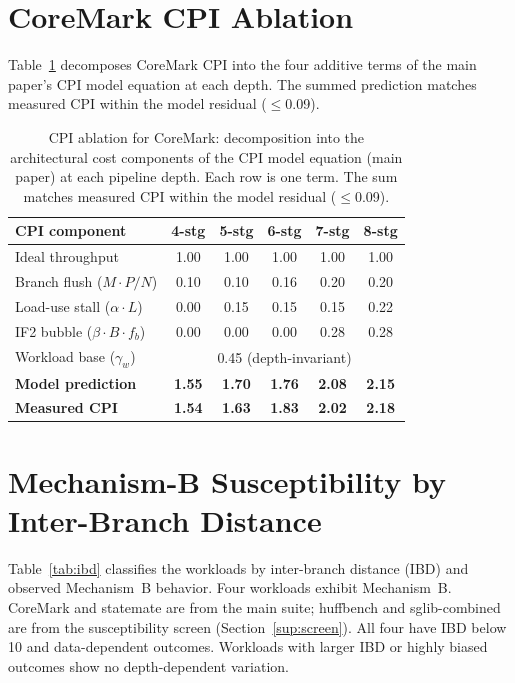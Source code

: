 \documentclass[acmsmall,nonacm,screen]{acmart}
\begin{document}
\section{CoreMark CPI Ablation}
\label{sup:ablation}
Table~\ref{tab:ablation} decomposes CoreMark CPI into the four additive terms of the
main paper's CPI model equation at each depth. The summed prediction matches measured
CPI within the model residual ($\leq$0.09).

\begin{table}[h]
\centering
\caption{CPI ablation for CoreMark: decomposition into the architectural cost components of the CPI model equation (main paper) at each pipeline depth. Each row is one term. The sum matches measured CPI within the model residual ($\leq$0.09).}
\label{tab:ablation}
\small
\begin{tabular}{@{}lccccc@{}}
\toprule
\textbf{CPI component} & \textbf{4-stg} & \textbf{5-stg} & \textbf{6-stg} & \textbf{7-stg} & \textbf{8-stg} \\
\midrule
Ideal throughput                       & 1.00 & 1.00 & 1.00 & 1.00 & 1.00 \\
Branch flush ($M \cdot P / N$)         & 0.10 & 0.10 & 0.16 & 0.20 & 0.20 \\
Load-use stall ($\alpha \cdot L$)      & 0.00 & 0.15 & 0.15 & 0.15 & 0.22 \\
IF2 bubble ($\beta \cdot B \cdot f_b$) & 0.00 & 0.00 & 0.00 & 0.28 & 0.28 \\
Workload base ($\gamma_w$)             & \multicolumn{5}{c}{0.45 (depth-invariant)} \\
\midrule
\textbf{Model prediction}              & \textbf{1.55} & \textbf{1.70} & \textbf{1.76} & \textbf{2.08} & \textbf{2.15} \\
\textbf{Measured CPI}                  & \textbf{1.54} & \textbf{1.63} & \textbf{1.83} & \textbf{2.02} & \textbf{2.18} \\
\bottomrule
\end{tabular}
\end{table}

\section{Mechanism-B Susceptibility by Inter-Branch Distance}
\label{sup:ibd}
Table~\ref{tab:ibd} classifies the workloads by inter-branch distance (IBD) and
observed Mechanism~B behavior. Four workloads exhibit Mechanism~B. CoreMark and
statemate are from the main suite; huffbench and sglib-combined are from the
susceptibility screen (Section~\ref{sup:screen}). All four have IBD below 10 and
data-dependent outcomes. Workloads with larger IBD or highly biased outcomes show no
depth-dependent variation.
\end{document}
